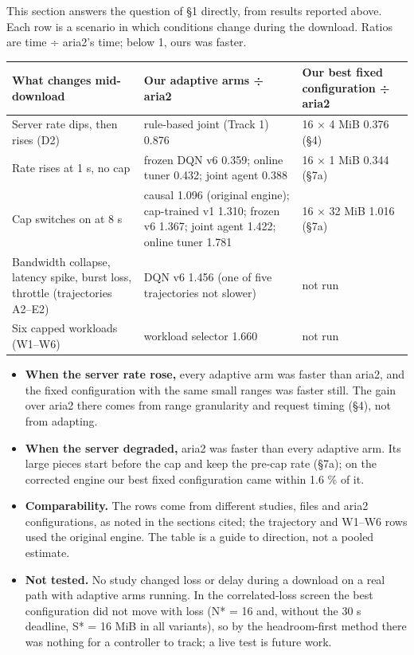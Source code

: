 \documentclass[conference]{IEEEtran}
\begin{document}
This section answers the question of §1 directly, from results reported above. Each row is a scenario in which conditions change during the download. Ratios are time ÷ aria2's time; below 1, ours was faster.


\begin{table}[!t]\centering\footnotesize
\begin{tabularx}{\textwidth}{@{}LLL@{}}
\toprule
\textbf{What changes mid-download} & \textbf{Our adaptive arms ÷ aria2} & \textbf{Our best fixed configuration ÷ aria2}\\
\midrule
Server rate dips, then rises (D2) & rule-based joint (Track 1) 0.876 & 16 × 4 MiB 0.376 (§4)\\
Rate rises at 1 s, no cap & frozen DQN v6 0.359; online tuner 0.432; joint agent 0.388 & 16 × 1 MiB 0.344 (§7a)\\
Cap switches on at 8 s & causal 1.096 (original engine); cap-trained v1 1.310; frozen v6 1.367; joint agent 1.422; online tuner 1.781 & 16 × 32 MiB 1.016 (§7a)\\
Bandwidth collapse, latency spike, burst loss, throttle (trajectories A2–E2) & DQN v6 1.456 (one of five trajectories not slower) & not run\\
Six capped workloads (W1–W6) & workload selector 1.660 & not run\\
\bottomrule
\end{tabularx}
\end{table}


\begin{itemize}
\item \textbf{When the server rate rose,} every adaptive arm was faster than aria2, and the fixed configuration with the same small ranges was faster still. The gain over aria2 there comes from range granularity and request timing (§4), not from adapting.
\item \textbf{When the server degraded,} aria2 was faster than every adaptive arm. Its large pieces start before the cap and keep the pre-cap rate (§7a); on the corrected engine our best fixed configuration came within 1.6 \% of it.
\item \textbf{Comparability.} The rows come from different studies, files and aria2 configurations, as noted in the sections cited; the trajectory and W1–W6 rows used the original engine. The table is a guide to direction, not a pooled estimate.
\item \textbf{Not tested.} No study changed loss or delay during a download on a real path with adaptive arms running. In the correlated-loss screen the best configuration did not move with loss (N* = 16 and, without the 30 s deadline, S* = 16 MiB in all variants), so by the headroom-first method there was nothing for a controller to track; a live test is future work.
\end{itemize}
\end{document}
